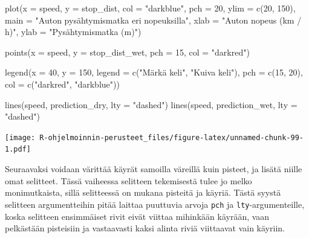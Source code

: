 \documentclass[
]{book}
\newenvironment{Shaded}{\begin{snugshade}}{\end{snugshade}}
\newcommand{\AttributeTok}[1]{\textcolor[rgb]{0.77,0.63,0.00}{#1}}
\newcommand{\DecValTok}[1]{\textcolor[rgb]{0.00,0.00,0.81}{#1}}
\newcommand{\FunctionTok}[1]{\textcolor[rgb]{0.00,0.00,0.00}{#1}}
\newcommand{\NormalTok}[1]{#1}
\newcommand{\StringTok}[1]{\textcolor[rgb]{0.31,0.60,0.02}{#1}}
\begin{document}
\begin{Shaded}
\begin{Highlighting}[]
\FunctionTok{plot}\NormalTok{(}\AttributeTok{x =}\NormalTok{ speed, }\AttributeTok{y =}\NormalTok{ stop\_dist,}
     \AttributeTok{col =} \StringTok{"darkblue"}\NormalTok{, }\AttributeTok{pch =} \DecValTok{20}\NormalTok{,}
     \AttributeTok{ylim =} \FunctionTok{c}\NormalTok{(}\DecValTok{20}\NormalTok{, }\DecValTok{150}\NormalTok{),}
     \AttributeTok{main =} \StringTok{"Auton pysähtymismatka eri nopeuksilla"}\NormalTok{,}
     \AttributeTok{xlab =} \StringTok{"Auton nopeus (km / h)"}\NormalTok{, }\AttributeTok{ylab =} \StringTok{"Pysähtymismatka (m)"}\NormalTok{)}

\FunctionTok{points}\NormalTok{(}\AttributeTok{x =}\NormalTok{ speed, }\AttributeTok{y =}\NormalTok{ stop\_dist\_wet, }\AttributeTok{pch =} \DecValTok{15}\NormalTok{, }\AttributeTok{col =} \StringTok{"darkred"}\NormalTok{)}

\FunctionTok{legend}\NormalTok{(}\AttributeTok{x =} \DecValTok{40}\NormalTok{, }\AttributeTok{y =} \DecValTok{150}\NormalTok{,}
       \AttributeTok{legend =} \FunctionTok{c}\NormalTok{(}\StringTok{"Märkä keli"}\NormalTok{, }\StringTok{"Kuiva keli"}\NormalTok{),}
       \AttributeTok{pch =} \FunctionTok{c}\NormalTok{(}\DecValTok{15}\NormalTok{, }\DecValTok{20}\NormalTok{), }\AttributeTok{col =} \FunctionTok{c}\NormalTok{(}\StringTok{"darkred"}\NormalTok{, }\StringTok{"darkblue"}\NormalTok{))}

\FunctionTok{lines}\NormalTok{(speed, prediction\_dry, }\AttributeTok{lty =} \StringTok{"dashed"}\NormalTok{)}
\FunctionTok{lines}\NormalTok{(speed, prediction\_wet, }\AttributeTok{lty =} \StringTok{"dashed"}\NormalTok{)}
\end{Highlighting}
\end{Shaded}

\texttt{[image: R-ohjelmoinnin-perusteet\_files/figure-latex/unnamed-chunk-99-1.pdf]}

Seuraavaksi voidaan värittää käyrät samoilla väreillä kuin pisteet, ja lisätä niille omat selitteet. Tässä vaiheessa selitteen tekemisestä tulee jo melko monimutkaista, sillä selitteessä on mukana pisteitä ja käyriä. Tästä syystä selitteen argumentteihin pitää laittaa puuttuvia arvoja \texttt{pch} ja \texttt{lty}-argumenteille, koska selitteen ensimmäiset rivit eivät viittaa mihinkään käyrään, vaan pelkästään pisteisiin ja vastaavasti kaksi alinta riviä viittaavat vain käyriin.
\end{document}
